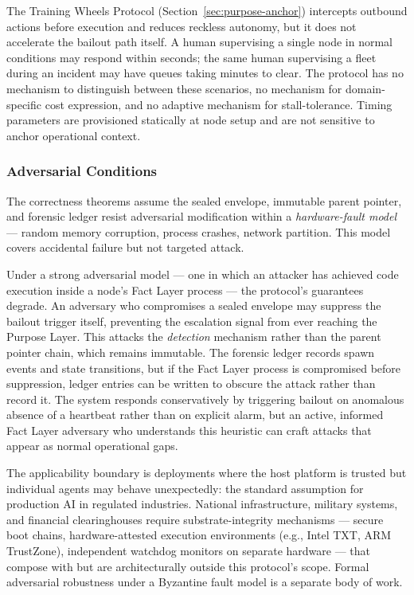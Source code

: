 The Training Wheels Protocol (Section~\ref{sec:purpose-anchor}) intercepts outbound actions before execution and reduces reckless autonomy, but it does not accelerate the bailout path itself. A human supervising a single node in normal conditions may respond within seconds; the same human supervising a fleet during an incident may have queues taking minutes to clear. The protocol has no mechanism to distinguish between these scenarios, no mechanism for domain-specific cost expression, and no adaptive mechanism for stall-tolerance. Timing parameters are provisioned statically at node setup and are not sensitive to anchor operational context.

\subsubsection{Adversarial Conditions}
\label{sec:limitations-adversarial}

The correctness theorems assume the sealed envelope, immutable parent pointer, and forensic ledger resist adversarial modification within a \emph{hardware-fault model} --- random memory corruption, process crashes, network partition. This model covers accidental failure but not targeted attack.

Under a strong adversarial model --- one in which an attacker has achieved code execution inside a node's Fact Layer process --- the protocol's guarantees degrade. An adversary who compromises a sealed envelope may suppress the bailout trigger itself, preventing the escalation signal from ever reaching the Purpose Layer. This attacks the \emph{detection} mechanism rather than the parent pointer chain, which remains immutable. The forensic ledger records spawn events and state transitions, but if the Fact Layer process is compromised before suppression, ledger entries can be written to obscure the attack rather than record it. The system responds conservatively by triggering bailout on anomalous absence of a heartbeat rather than on explicit alarm, but an active, informed Fact Layer adversary who understands this heuristic can craft attacks that appear as normal operational gaps.

The applicability boundary is deployments where the host platform is trusted but individual agents may behave unexpectedly: the standard assumption for production AI in regulated industries. National infrastructure, military systems, and financial clearinghouses require substrate-integrity mechanisms --- secure boot chains, hardware-attested execution environments (e.g., Intel TXT, ARM TrustZone), independent watchdog monitors on separate hardware --- that compose with but are architecturally outside this protocol's scope. Formal adversarial robustness under a Byzantine fault model is a separate body of work.

